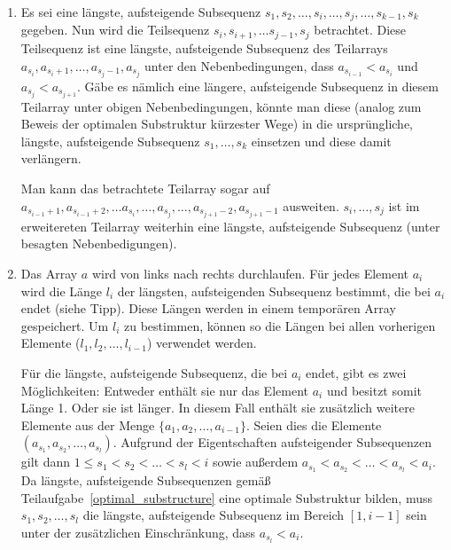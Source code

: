 \documentclass[11pt,a4paper]{article}
\begin{document}
\begin{loesung}
    \begin{enumerate}
        \item Es sei eine längste, aufsteigende Subsequenz $s_1, s_2, \ldots, s_i, \ldots, s_j, \ldots, s_{k - 1}, s_k$ gegeben.
        Nun wird die Teilsequenz $s_i, s_{i + 1}, \ldots s_{j - 1}, s_j$ betrachtet.
        Diese Teilsequenz ist eine längste, aufsteigende Subsequenz des Teilarrays $a_{s_i}, a_{s_i + 1}, \ldots, a_{s_j - 1}, a_{s_j}$ unter den Nebenbedingungen, dass $a_{s_{i - 1}} < a_{s_i}$ und $a_{s_j} < a_{s_{j + 1}}$.
        Gäbe es nämlich eine längere, aufsteigende Subsequenz in diesem Teilarray unter obigen Nebenbedingungen, könnte man diese (analog zum Beweis der optimalen Substruktur kürzester Wege) in die ursprüngliche, längste, aufsteigende Subsequenz $s_1, \ldots, s_k$ einsetzen und diese damit verlängern.

        Man kann das betrachtete Teilarray sogar auf $a_{s_{i - 1} + 1}, a_{s_{i - 1} + 2}, \ldots a_{s_i}, \ldots, a_{s_j}, \ldots, a_{s_{j + 1} - 2}, a_{s_{j + 1} - 1}$ ausweiten.
        $s_i, \ldots, s_j$ ist im erweitereten Teilarray weiterhin eine längste, aufsteigende Subsequenz (unter besagten Nebenbedigungen).

        \item 
        Das Array $a$ wird von links nach rechts durchlaufen. Für jedes Element $a_i$ wird die Länge $l_i$ der längsten, aufsteigenden Subsequenz bestimmt, die bei $a_i$ endet (siehe Tipp).
        Diese Längen werden in einem temporären Array gespeichert.
        Um $l_i$ zu bestimmen, können so die Längen bei allen vorherigen Elemente ($l_1, l_2, \ldots, l_{i-1}$) verwendet werden.
        
        Für die längste, aufsteigende Subsequenz, die bei $a_i$ endet, gibt es zwei Möglichkeiten:
        Entweder enthält sie nur das Element $a_i$ und besitzt somit Länge 1.
        Oder sie ist länger.
        In diesem Fall enthält sie zusätzlich weitere Elemente aus der Menge $\{a_1, a_2, \ldots, a_{i - 1}\}$.
        Seien dies die Elemente $(a_{s_1}, a_{s_2}, \ldots, a_{s_l})$.
        Aufgrund der Eigentschaften aufsteigender Subsequenzen gilt dann $1 \leq s_1 < s_2 < \ldots < s_l < i$ sowie außerdem $a_{s_1} < a_{s_2} < \ldots < a_{s_l} < a_i$.
        Da längste, aufsteigende Subsequenzen gemäß Teilaufgabe~\ref*{optimal_substructure} eine optimale Substruktur bilden, muss $s_1, s_2, \ldots, s_l$ die längste, aufsteigende Subsequenz im Bereich $[1, i - 1]$ sein unter der zusätzlichen Einschränkung, dass $a_{s_l} < a_i$.


\end{enumerate}
\end{loesung}
\end{document}
